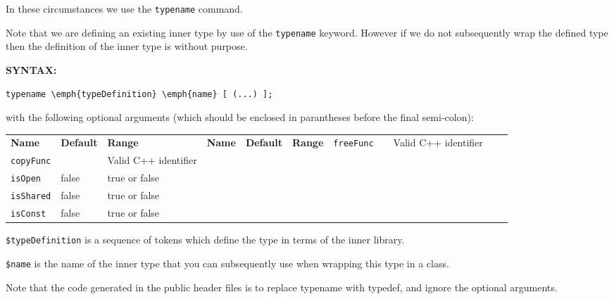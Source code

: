 In these circumstances we use the \texttt{typename} command.

Note that we are defining an existing inner type by use of the \texttt{typename} keyword. However if we do not subsequently wrap the defined type then the definition of the inner type is without purpose.

\textbf{SYNTAX:}
\nopagebreak
\begin{Verbatim}[commandchars=\\\{\}]
    typename \emph{typeDefinition} \emph{name} [ (...) ];
\end{Verbatim}

with the following optional arguments (which should be enclosed in parantheses before the final semi-colon):


\small

\begin{longtable}{|p{80pt}|p{150pt}|p{140pt}|l}

 \textbf{Name} & \textbf{Default} & \textbf{Range} & 
\endfirsthead

 \textbf{Name} & \textbf{Default} & \textbf{Range} & 
\endhead

 
\endfoot

\endlastfoot

 \texttt{freeFunc} &  & Valid C++ identifier \\ 

 \texttt{copyFunc} &  & Valid C++ identifier \\ 

 \texttt{isOpen} & false & true or false \\ 

 \texttt{isShared} & false & true or false \\ 

 \texttt{isConst} & false & true or false \\ 

\end{longtable}
\normalsize
\texttt{\$typeDefinition} is a sequence of tokens which define the type in terms of the inner library.

\texttt{\$name} is the name of the inner type that you can subsequently use when wrapping this type in a class.

Note that the code generated in the public header files is to replace typename with typedef, and ignore the optional arguments.

